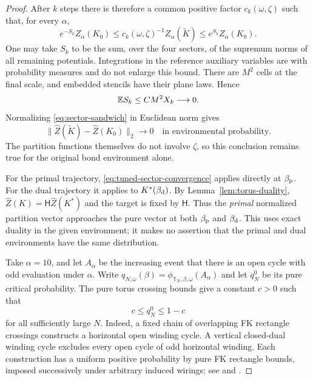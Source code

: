 \begin{proof}
After $k$ steps there is therefore a common positive factor
$c_k(\omega,\zeta)$ such that, for every $\alpha$,
\begin{equation}
 e^{-S_k}Z_\alpha(K_0)
 \le c_k(\omega,\zeta)^{-1}Z_\alpha(\widetilde K)
 \le e^{S_k}Z_\alpha(K_0).
 \label{eq:sector-sandwich}
\end{equation}
One may take $S_k$ to be the sum, over the four sectors, of the
supremum norms of all remaining potentials. Integrations in the
reference auxiliary variables are with probability measures and do
not enlarge this bound. There are $M^2$ cells at the final scale,
and embedded stencils have their plane laws. Hence
\[
             \mathbb E S_k\le C M^2X_k\longrightarrow0.
\]
Normalizing \eqref{eq:sector-sandwich} in Euclidean norm gives
\begin{equation}
 \bigl\|\widehat Z(\widetilde K)-\widehat Z(K_0)\bigr\|_2
          \longrightarrow0
       \quad\text{in environmental probability}.
 \label{eq:tuned-sector-convergence}
\end{equation}
The partition functions themselves do not involve $\zeta$, so this
conclusion remains true for the original bond environment alone.

For the primal trajectory, \eqref{eq:tuned-sector-convergence}
applies directly at $\beta_{\rm p}$. For the dual trajectory it
applies to $K^*(\beta_{\rm d})$. By
Lemma~\ref{lem:torus-duality},
$\widehat Z(K)=\mathsf H\widehat Z(K^*)$ and the target is fixed
by $\mathsf H$. Thus the \emph{primal} normalized partition vector
approaches the pure vector at both $\beta_{\rm p}$ and
$\beta_{\rm d}$. This uses exact duality in the given environment;
it makes no assertion that the primal and dual environments have
the same distribution.

Take $\alpha=10$, and let $A_\alpha$ be the increasing event that
there is an open cycle with odd evaluation under $\alpha$. Write
$q_{N,\omega}(\beta)=\phi_{\mathbb T_N,\beta,\omega}(A_\alpha)$
and let $q_N^0$ be its pure critical probability. The pure torus
crossing bounds give a constant $c>0$ such that
\begin{equation}
                    c\le q_N^0\le1-c
 \label{eq:pure-torus-nondegeneracy}
\end{equation}
for all sufficiently large $N$. Indeed, a fixed chain of overlapping
FK rectangle crossings constructs a horizontal open winding cycle.
A vertical closed-dual winding cycle excludes every open cycle of
odd horizontal winding. Each construction has a uniform positive
probability by pure FK rectangle bounds, imposed successively under
arbitrary induced wirings; see \cite[Section~8]{R} and
\cite[Section~2, ``Pure buffered RSW consequences'']{S}.


\end{proof}
